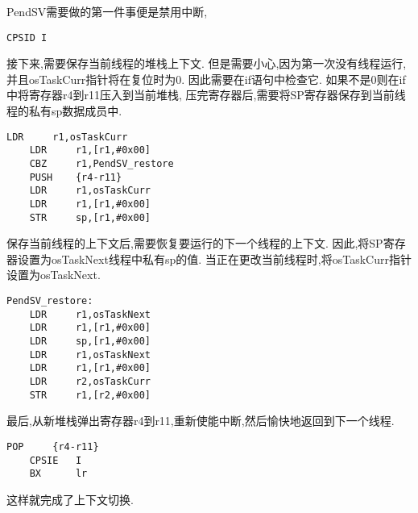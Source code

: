 PendSV需要做的第一件事便是禁用中断,
\begin{lstlisting}[language={[ANSI]C},keywordstyle=\color{blue!70},commentstyle=\color{red!50!green!50!blue!50},frame=shadowbox, rulesepcolor=\color{red!20!green!20!blue!20}]
    CPSID I
\end{lstlisting}
接下来,需要保存当前线程的堆栈上下文.
但是需要小心,因为第一次没有线程运行,并且osTaskCurr指针将在复位时为0.
因此需要在if语句中检查它.
如果不是0则在if中将寄存器r4到r11压入到当前堆栈,
压完寄存器后,需要将SP寄存器保存到当前线程的私有sp数据成员中.
\begin{lstlisting}[language={[ANSI]C},keywordstyle=\color{blue!70},commentstyle=\color{red!50!green!50!blue!50},frame=shadowbox, rulesepcolor=\color{red!20!green!20!blue!20}]
    LDR		r1,osTaskCurr
    LDR		r1,[r1,#0x00]
    CBZ		r1,PendSV_restore
	PUSH	{r4-r11}
	LDR		r1,osTaskCurr
	LDR		r1,[r1,#0x00]
	STR		sp,[r1,#0x00]
\end{lstlisting}

保存当前线程的上下文后,需要恢复要运行的下一个线程的上下文.
因此,将SP寄存器设置为osTaskNext线程中私有sp的值.
当正在更改当前线程时,将osTaskCurr指针设置为osTaskNext.
\begin{lstlisting}[language={[ANSI]C},keywordstyle=\color{blue!70},commentstyle=\color{red!50!green!50!blue!50},frame=shadowbox, rulesepcolor=\color{red!20!green!20!blue!20}]
PendSV_restore:
	LDR		r1,osTaskNext
	LDR		r1,[r1,#0x00]
	LDR		sp,[r1,#0x00]
	LDR		r1,osTaskNext
 	LDR		r1,[r1,#0x00]
 	LDR		r2,osTaskCurr
    STR		r1,[r2,#0x00]
\end{lstlisting}

最后,从新堆栈弹出寄存器r4到r11,重新使能中断,然后愉快地返回到下一个线程.
\begin{lstlisting}[language={[ANSI]C},keywordstyle=\color{blue!70},commentstyle=\color{red!50!green!50!blue!50},frame=shadowbox, rulesepcolor=\color{red!20!green!20!blue!20}]  
    POP		{r4-r11}
    CPSIE	I
	BX		lr
\end{lstlisting}

这样就完成了上下文切换.

